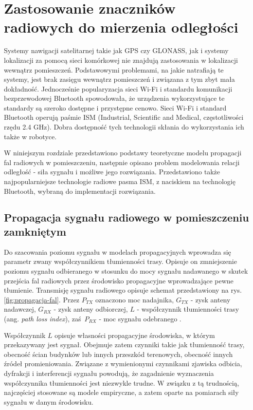 \chapter{Zastosowanie znaczników radiowych do mierzenia odległości}
\label{ch:radio}
Systemy nawigacji satelitarnej takie jak GPS czy GLONASS, jak i systemy lokalizacji za pomocą sieci komórkowej nie znajdują zastosowania w lokalizacji wewnątrz pomieszczeń. Podstawowymi problemami, na jakie natrafiają te systemy, jest brak zasięgu wewnątrz pomieszczeń i związana z tym zbyt mała dokładność.
Jednocześnie popularyzacja sieci Wi-Fi i standardu komunikacji bezprzewodowej Bluetooth spowodowała, że urządzenia wykorzystujące te standardy są szeroko dostępne i przystępne cenowo. Sieci Wi-Fi i standard Bluetooth operują paśmie ISM (Industrial, Scientific and Medical, częstotliwości rzędu 2.4 GHz). Dobra dostępność tych technologii skłania do wykorzystania ich także w robotyce. 

W niniejszym rozdziale przedstawiono podstawy teoretyczne modelu propagacji fal radiowych w pomieszczeniu, następnie opisano problem modelowania relacji odległość - siła sygnału i możliwe jego rozwiązania. Przedstawiono także najpopularniejsze technologie radiowe pasma ISM, z naciskiem na technologię Bluetooth, wybraną do implementacji rozwiązania. 

\section{Propagacja sygnału radiowego w pomieszczeniu zamkniętym}
Do szacowania poziomu sygnału w modelach propagacyjnych wprowadza się parametr zwany współczynnikiem tłumienności trasy. Opisuje on zmniejszenie poziomu sygnału odbieranego w stosunku do mocy sygnału nadawanego w skutek przejścia fal radiowych przez środowisko propagacyjne wprowadzające pewne tłumienie. Transmisję sygnału radiowego opisuje schemat przedstawiony na rys. \ref{fig:propagacja-fal}. Przez $P_{TX}$ oznaczono moc nadajnika, $G_{TX}$ - zysk anteny nadawczej, $G_{RX}$ - zysk anteny odbiorczej, $L$ - współczynnik tłumienności trasy (ang. \textit{path loss index}), zaś $P_{RX}$ - moc sygnału odebranego \cite{rssi}. 

Współczynnik $L$ opisuje własności propagacyjne środowiska, w którym przekazywany jest sygnał. Obejmuje zatem czynniki takie jak tłumienność trasy, obecność ścian budynków lub innych przeszkód terenowych, obecność innych źródeł promieniowania. Związane z wymienionymi czynnikami zjawiska odbicia, dyfrakcji i interferencji sygnału powodują, że zagadnienie wyznaczenia współczynnika tłumienności jest niezwykle trudne. W związku z tą trudnością, najczęściej stosowane są modele empiryczne, a zatem oparte na pomiarach siły sygnału w danym środowisku. 

